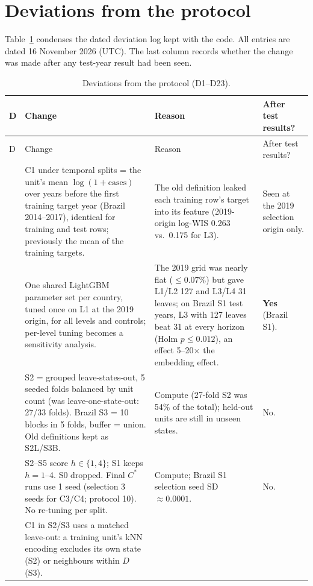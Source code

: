 \documentclass[11pt]{article}
\newcommand{\Cstar}{C^{\ast}}
\begin{document}
\section{Deviations from the protocol}
\label{app:deviations}
Table~\ref{tab:deviations} condenses the dated deviation log kept with the code. All entries are dated
16 November 2026 (UTC). The last column records whether the change was made after any test-year result
had been seen.

{\footnotesize
\setlength{\tabcolsep}{3pt}
\begin{longtable}{>{\raggedright\arraybackslash}p{0.4cm}>{\raggedright\arraybackslash}p{6.4cm}>{\raggedright\arraybackslash}p{5.3cm}>{\raggedright\arraybackslash}p{2.6cm}}
\caption{Deviations from the protocol (D1--D23).}\label{tab:deviations}\\
\toprule
D & Change & Reason & After test results? \\
\midrule
\endfirsthead
\toprule
D & Change & Reason & After test results? \\
\midrule
\endhead
\bottomrule
\endfoot
1 & C1 under temporal splits = the unit's mean $\log(1+\text{cases})$ over years before the first training target
year (Brazil 2014--2017), identical for training and test rows; previously the mean of the training targets. &
The old definition leaked each training row's target into its feature (2019-origin log-WIS 0.263 vs.\ 0.175 for L3). &
Seen at the 2019 selection origin only. \\
2 & One shared LightGBM parameter set per country, tuned once on L1 at the 2019 origin, for all levels and controls;
per-level tuning becomes a sensitivity analysis. &
The 2019 grid was nearly flat ($\leq 0.07\%$) but gave L1/L2 127 and L3/L4 31 leaves; on Brazil S1 test years,
L3 with 127 leaves beat 31 at every horizon (Holm $p\leq 0.012$), an effect 5--20$\times$ the embedding effect. &
\textbf{Yes} (Brazil S1). \\
3 & S2 = grouped leave-states-out, 5 seeded folds balanced by unit count (was leave-one-state-out: 27/33 folds).
Brazil S3 = 10 blocks in 5 folds, buffer = union. Old definitions kept as S2L/S3B. &
Compute (27-fold S2 was 54\% of the total); held-out units are still in unseen states. & No. \\
4 & S2--S5 score $h\in\{1,4\}$; S1 keeps $h=1$--4. S0 dropped. Final $\Cstar$ runs use 1 seed (selection 3 seeds for
C3/C4; protocol 10). No re-tuning per split. & Compute; Brazil S1 selection seed SD $\approx 0.0001$. & No. \\
5 & C1 in S2/S3 uses a matched leave-out: a training unit's kNN encoding excludes its own state (S2) or neighbours within $D$ (S3). &

\end{longtable}}
\end{document}

